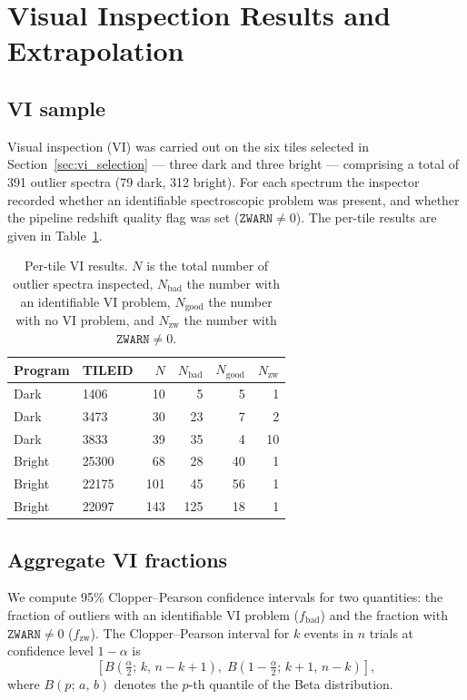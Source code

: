 \section{Visual Inspection Results and Extrapolation}

\subsection{VI sample}

Visual inspection (VI) was carried out on the six tiles selected in
Section~\ref{sec:vi_selection} — three dark and three bright — comprising
a total of 391 outlier spectra (79 dark, 312 bright).
For each spectrum the inspector recorded whether an identifiable spectroscopic
problem was present, and whether the pipeline redshift quality flag was set
($\texttt{ZWARN} \neq 0$).
The per-tile results are given in Table~\ref{tab:vi_tiles}.

\begin{table}[h]
\centering
\caption{Per-tile VI results. $N$ is the total number of outlier spectra inspected,
$N_\mathrm{bad}$ the number with an identifiable VI problem,
$N_\mathrm{good}$ the number with no VI problem,
and $N_\mathrm{zw}$ the number with $\texttt{ZWARN}\neq 0$.}
\label{tab:vi_tiles}
\begin{tabular}{llrrrr}
\hline
Program & TILEID & $N$ & $N_\mathrm{bad}$ & $N_\mathrm{good}$ & $N_\mathrm{zw}$ \\
\hline
Dark   & 1406  &  10 &   5 &   5 &  1 \\
Dark   & 3473  &  30 &  23 &   7 &  2 \\
Dark   & 3833  &  39 &  35 &   4 & 10 \\
\hline
Bright & 25300 &  68 &  28 &  40 &  1 \\
Bright & 22175 & 101 &  45 &  56 &  1 \\
Bright & 22097 & 143 & 125 &  18 &  1 \\
\hline
\end{tabular}
\end{table}

\subsection{Aggregate VI fractions}

We compute 95\% Clopper--Pearson confidence intervals for two quantities:
the fraction of outliers with an identifiable VI problem ($f_\mathrm{bad}$)
and the fraction with $\texttt{ZWARN}\neq 0$ ($f_\mathrm{zw}$).
The Clopper--Pearson interval for $k$ events in $n$ trials at confidence level
$1-\alpha$ is
\begin{equation}
    \left[
        B\!\left(\tfrac{\alpha}{2};\,k,\,n-k+1\right),\;
        B\!\left(1-\tfrac{\alpha}{2};\,k+1,\,n-k\right)
    \right],
\end{equation}
where $B(p;\,a,\,b)$ denotes the $p$-th quantile of the Beta distribution.


